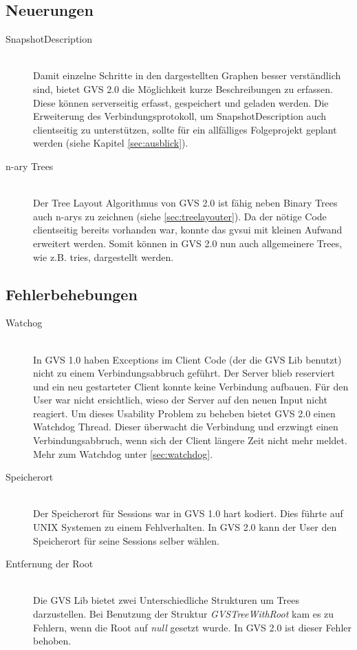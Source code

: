 \documentclass[11pt,a4paper,english,oneside]{book}
\numberwithin{equation}{chapter}
\begin{document}
	\subsection{Neuerungen} \label{ssec:neuerungen}
	\begin{description}
		\item[SnapshotDescription] \hfill \\ 
		Damit einzelne Schritte in den dargestellten Graphen besser verständlich sind, bietet GVS 2.0 die Möglichkeit kurze Beschreibungen zu erfassen. Diese können serverseitig erfasst, gespeichert und geladen werden. Die Erweiterung des Verbindungsprotokoll, um SnapshotDescription auch clientseitig zu unterstützen, sollte für ein allfälliges Folgeprojekt geplant werden (siehe Kapitel \ref{sec:ausblick}).
		\item[n-ary Trees] \hfill \\
		Der Tree Layout Algorithmus von GVS 2.0 ist fähig neben Binary Trees auch \glspl{n-ary} zu zeichnen (siehe \ref{sec:treelayouter}). Da der nötige Code clientseitig bereits vorhanden war, konnte das \gls{gvsui} mit kleinen Aufwand erweitert werden. Somit können in GVS 2.0 nun auch allgemeinere Trees, wie z.B. \glspl{trie}, dargestellt werden.
	\end{description}
	
	\subsection{Fehlerbehebungen}
	\begin{description}
		\item[Watchog] \hfill \\ 
		In GVS 1.0 haben Exceptions im Client Code (der die GVS Lib benutzt) nicht zu einem Verbindungsabbruch geführt. Der Server blieb reserviert und ein neu gestarteter Client konnte keine Verbindung aufbauen. Für den User war nicht ersichtlich, wieso der Server auf den neuen Input nicht reagiert. Um dieses Usability Problem zu beheben bietet GVS 2.0 einen Watchdog Thread. Dieser überwacht die Verbindung und erzwingt einen Verbindungsabbruch, wenn sich der Client längere Zeit nicht mehr meldet. Mehr zum Watchdog unter \ref{sec:watchdog}.
		\item[Speicherort]  \hfill \\ Der Speicherort für Sessions war in GVS 1.0 hart kodiert. Dies führte auf UNIX Systemen zu einem Fehlverhalten. In GVS 2.0 kann der User den Speicherort für seine Sessions selber wählen.
		\item[Entfernung der Root] \hfill \\ Die GVS Lib bietet zwei Unterschiedliche Strukturen um Trees darzustellen. Bei Benutzung der Struktur \textit{GVSTreeWithRoot} kam es zu Fehlern, wenn die Root auf \textit{null} gesetzt wurde. In GVS 2.0 ist dieser Fehler behoben.
	\end{description}
\end{document}
